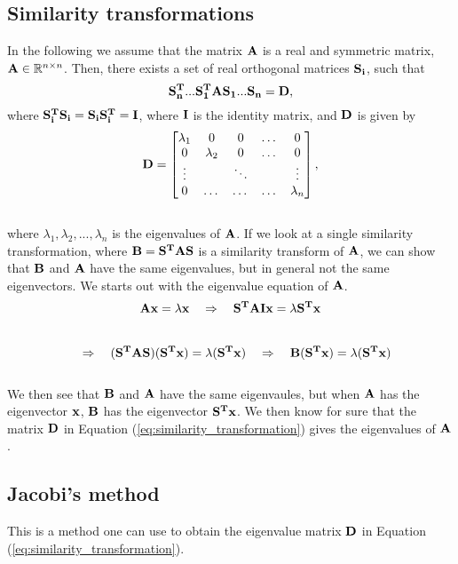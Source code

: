 \documentclass[12pt]{article}
\begin{document}
\begin{flushleft}
\subsection*{Similarity transformations}
In the following we assume that the matrix $\bf A$ is a real and symmetric matrix, ${\bf A}\in \mathbb{R}^{n\times n}$. Then, there exists a set of real orthogonal matrices $\bf S_i$, such that \\
\vspace{5mm}
\begin{equation}\label{eq:similarity_transformation}
{\bf S_n^T...S_1^T A S_1...S_n} = {\bf D},
\end{equation}
\vspace{5mm}
where ${\bf S_i^T S_i = S_i S_i^T = I}$, where ${\bf I}$ is the identity matrix, and $\bf D$ is given by\\
\vspace{5mm}
$${\bf D} = 
\begin{bmatrix}
       \lambda_1 & 0 & 0 & \dots & 0          \\
       0 & \lambda_2 & 0 & \dots & 0 \\
       \vdots &  & \ddots & & \vdots \\
       0 & \dots & \dots & \dots & \lambda_n
\end{bmatrix},$$\\ 
\vspace{5mm}
where $\lambda_1, \lambda_2,...,\lambda_n$ is the eigenvalues of $\bf A$. If we look at a single similarity transformation, where $\bf B = S^T A S$ is a similarity transform of $\bf A$, we can show that $\bf B$ and $\bf A$ have the same eigenvalues, but in general not the same eigenvectors. We starts out with the eigenvalue equation of $\bf A$.\\
\vspace{5mm}
$${\bf Ax } = \lambda\bf x \quad\Rightarrow\quad {\bf S^T A I x} = \lambda {\bf S^T x}$$\\
$$\quad\Rightarrow\quad {\bf (S^T A S) (S^T x)} = \lambda {\bf (S^T x)} \quad\Rightarrow\quad {\bf B (S^T x)} = \lambda {\bf (S^T x)}$$\\
\vspace{5mm}
We then see that $\bf B$ and $\bf A$ have the same eigenvaules, but when $\bf A$ has the eigenvector $\bf x$, $\bf B$ has the eigenvector $\bf S^T x$. We then know for sure that the matrix $\bf D$ in Equation (\ref{eq:similarity_transformation}) gives the eigenvalues of $\bf A$.
\newpage
\subsection*{Jacobi's method}
This is a method one can use to obtain the eigenvalue matrix $\bf D$ in Equation (\ref{eq:similarity_transformation}).



\end{flushleft}
\end{document}
